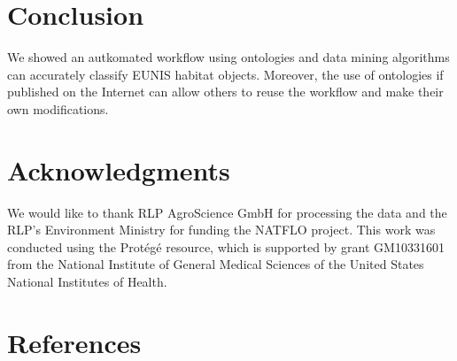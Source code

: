 \documentclass[authoryear, review,12pt,number]{elsarticle}
\begin{document}
\section{Conclusion} We showed an autkomated
workflow using ontologies and data mining algorithms can accurately classify
EUNIS habitat objects. Moreover, the use of ontologies if published on the
Internet can allow others to reuse the workflow and make their own
modifications. 
\section{Acknowledgments}
We would like to thank RLP AgroScience GmbH for processing the data and the
RLP's Environment Ministry for funding the NATFLO project. This work was
conducted using the Prot\'eg\'e resource, which is supported by grant GM10331601
from the National Institute of General Medical Sciences of the United States
National
Institutes of Health.

\section{References}  
\end{document}
